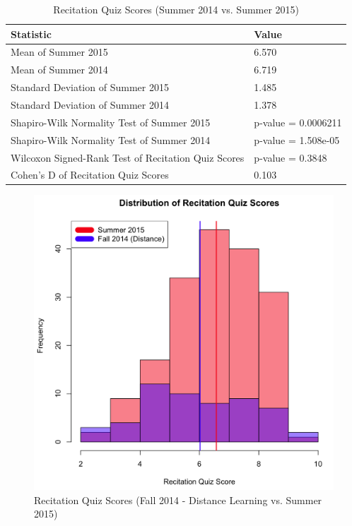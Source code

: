 \begin{small}
\begin{table}
  \centering
  \begin{tabular}{|l|l|}
    \hline
    \textbf{Statistic} & \textbf{Value} \\
	\hline
	Mean of Summer 2015 & 6.570 \\
	\hline
	Mean of Summer 2014 & 6.719 \\
	\hline
	Standard Deviation of Summer 2015 & 1.485 \\
	\hline
	Standard Deviation of Summer 2014 & 1.378 \\
	\hline
	Shapiro-Wilk Normality Test of Summer 2015 & p-value = 0.0006211 \\
	\hline
	Shapiro-Wilk Normality Test of Summer 2014 & p-value = 1.508e-05 \\
	\hline
	Wilcoxon Signed-Rank Test of Recitation Quiz Scores & p-value = 0.3848 \\
	\hline
	Cohen's D of Recitation Quiz Scores & 0.103 \\
	\hline
  \end{tabular}
	\caption[Recitation Quiz Scores (Summer 2014 vs. Summer 2015)]{Recitation Quiz Scores (Summer 2014 vs. Summer 2015)}
  \label{tab:rqSu14Su15}
\end{table}
\end{small}

\begin{figure}
	\centering
	\includegraphics[width=5in]{img/chapter4/rq_su15_vs_f14d}
	\caption[Recitation Quiz Scores (Fall 2014 - Distance Learning vs. Summer 2015)]{Recitation Quiz Scores (Fall 2014 - Distance Learning vs. Summer 2015)}
  \label{fig:rqf14dSu15}
\end{figure}

